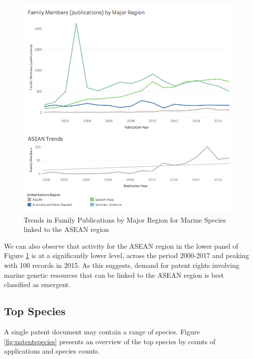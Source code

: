 \documentclass[openany]{book}
\theoremstyle{definition}
\theoremstyle{definition}
\theoremstyle{definition}
\theoremstyle{remark}
\begin{document}
\begin{figure}

{\centering \includegraphics[width=1\linewidth]{images-patents/family_trends_region} 

}

\caption{Trends in Family Publications by Major Region for Marine Species linked to the ASEAN region}\label{fig:familyregiontrends}
\end{figure}

We can also observe that activity for the ASEAN region in the lower
panel of Figure \ref{fig:familyregiontrends} is at a significantly lower
level, across the period 2000-2017 and peaking with 100 records in 2015.
As this suggests, demand for patent rights involving marine genetic
resources that can be linked to the ASEAN region is best classified as
emergent.

\hypertarget{top-species}{%
\subsection{Top Species}\label{top-species}}

A single patent document may contain a range of species. Figure
\ref{fig:patentspecies} presents an overview of the top species by
counts of applications and species counts.
\end{document}
